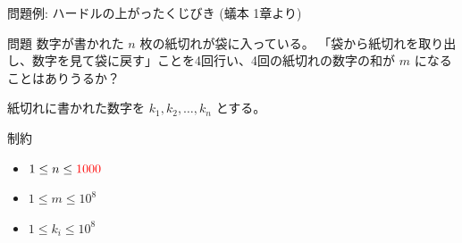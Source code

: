 \documentclass[dvipdfmx]{beamer}
\begin{document}
\begin{frame}{問題例: ハードルの上がったくじびき (蟻本 1章より)}
  \begin{block}{問題}
    数字が書かれた $n$ 枚の紙切れが袋に入っている。
    「袋から紙切れを取り出し、数字を見て袋に戻す」ことを4回行い、4回の紙切れの数字の和が $m$ になることはありうるか？

    紙切れに書かれた数字を $k_1, k_2, \ldots, k_n$ とする。
  \end{block}
  \begin{block}{制約}
    \begin{itemize}
      \item $1 \le n \le \textcolor{red}{1000}$
      \item $1 \le m \le 10^8$
      \item $1 \le k_i \le 10^8$
    \end{itemize}
  \end{block}
\end{frame}
\end{document}

